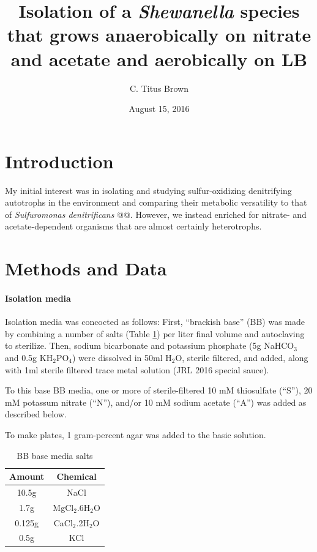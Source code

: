 \documentclass{article}
\begin{document}
\title{Isolation of a {\em Shewanella} species that grows
  anaerobically on nitrate and acetate and aerobically on LB}
\author{C. Titus Brown}
\date{August 15, 2016}

\maketitle

\section*{Introduction}

My initial interest was in isolating and studying sulfur-oxidizing
denitrifying autotrophs in the environment and comparing their
metabolic versatility to that of {\em Sulfuromonas denitrificans} @@.
However, we instead enriched for nitrate- and acetate-dependent
organisms that are almost certainly heterotrophs.

\section*{Methods and Data}

\paragraph{Isolation media} Isolation media was concocted as follows:
First, ``brackish base'' (BB) was made by combining a number of salts
(Table \ref{tab:media}) per liter final volume and autoclaving to
sterilize.  Then, sodium bicarbonate and potassium phosphate (5g
NaHCO$_3$ and 0.5g KH$_2$PO$_4$) were dissolved in 50ml H$_2$O,
sterile filtered, and added, along with 1ml sterile filtered trace
metal solution (JRL 2016 special sauce).

To this base BB media, one or more of sterile-filtered 10 mM
thiosulfate (``S''), 20 mM potassum nitrate (``N''), and/or 10 mM
sodium acetate (``A'') was added as described below.

To make plates, 1 gram-percent agar was added to the basic solution.

\begin{table}
\centering
\begin{tabular}{|c|c|}
\hline
Amount & Chemical \\
\hline
10.5g & NaCl \\
1.7g & MgCl$_2$.6H$_2$O \\
0.125g & CaCl$_2$.2H$_2$O \\
0.5g & KCl \\
\hline
\end{tabular}
\label{tab:media}
\caption{BB base media salts}
\end{table}
\end{document}
